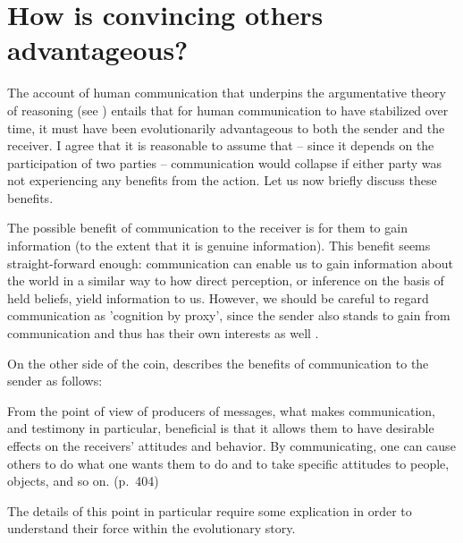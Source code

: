 
\section{How is convincing others advantageous?}

The account of human communication that underpins the argumentative theory of reasoning (see \citet{Sperber01, Sperber10})
entails that for human communication to have stabilized over time, it must have been evolutionarily advantageous to both the sender and the receiver. I agree that it is reasonable to assume that -- since it depends on the participation of two parties -- communication would collapse if either party was not experiencing any benefits from the action. Let us now briefly discuss these benefits.

The possible benefit of communication to the receiver is for them to gain information (to the extent that it is genuine information).
This benefit seems straight-forward enough: communication can enable us to gain information about the world in a similar way to how direct perception, or inference on the basis of held beliefs, yield information to us. However, we should be careful to regard communication as 'cognition by proxy', since the sender also stands to gain from communication and thus has their own interests as well \citep{Sperber01}.

On the other side of the coin, \citet{Sperber01} describes the benefits of communication to the sender as follows:
\begin{quoting}
    From the point of view of producers of messages, what makes communication, and testimony in particular, beneficial is that it allows them to have desirable effects on the receivers' attitudes and behavior. By communicating, one can cause others to do what one wants them to do and to take specific attitudes to people, objects, and so on.
    \hfill (p.~404)
\end{quoting}
The details of this point in particular require some explication in order to understand their force within the evolutionary story.

